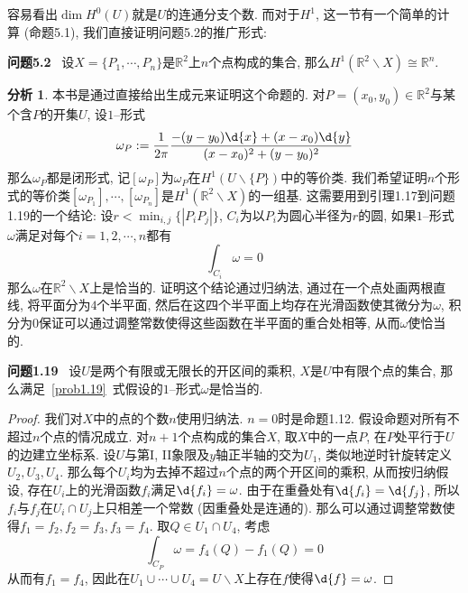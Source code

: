 \documentclass[11pt]{article}
\theoremstyle{definition}\newtheorem*{analyse}{分析}
\theoremstyle{remark}\newtheorem{rem*}{评注}
\newenvironment{env}[1]{\par\vspace{1em}\noindent\textbf{#1}\ }{\par\vspace{1em}}
\begin{document}
容易看出$\dim H^0(U)$就是$U$的连通分支个数.
而对于$H^1$, 这一节有一个简单的计算 (命题5.1), 我们直接证明问题5.2的推广形式:
\begin{env}{问题5.2}
    设$X=\{P_1,\cdots,P_n\}$是$\mathbb{R}^2$上$n$个点构成的集合, 那么$H^1(\mathbb{R}^2\backslash X)\cong\mathbb{R}^n$.
\end{env}
\begin{analyse}
    本书是通过直接给出生成元来证明这个命题的.
    对$P=(x_0,y_0)\in\mathbb{R}^2$与某个含$P$的开集$U$, 设$1$--形式
    \[\omega_P:=\frac{1}{2\pi}\frac{-(y-y_0)\d{x}+(x-x_0)\d{y}}{(x-x_0)^2+(y-y_0)^2}\]
    那么$\omega_P$都是闭形式, 记$[\omega_P]$为$\omega_P$在$H^1(U\backslash\{P\})$中的等价类.
    我们希望证明$n$个形式的等价类$[\omega_{P_1}],\cdots,[\omega_{P_n}]$是$H^1(\mathbb{R}^2\backslash X)$的一组基.
    这需要用到引理1.17到问题1.19的一个结论:
    设$r<\min_{i,j}\{|P_iP_j|\}$, $C_i$为以$P_i$为圆心半径为$r$的圆, 如果$1$--形式$\omega$满足对每个$i=1,2,\cdots,n$都有
    \begin{equation}
        \int_{C_i}\omega=0\label{prob1.19}
    \end{equation}
    那么$\omega$在$\mathbb{R}^2\backslash X$上是恰当的.
    证明这个结论通过归纳法, 通过在一个点处画两根直线, 将平面分为$4$个半平面, 然后在这四个半平面上均存在光滑函数使其微分为$\omega$,
    积分为$0$保证可以通过调整常数使得这些函数在半平面的重合处相等, 从而$\omega$使恰当的.
\end{analyse}
\begin{env}{问题1.19}
    设$U$是两个有限或无限长的开区间的乘积, $X$是$U$中有限个点的集合, 那么满足~\eqref{prob1.19}~式假设的$1$--形式$\omega$是恰当的.
\end{env}
\begin{proof}
    我们对$X$中的点的个数$n$使用归纳法.
    $n=0$时是命题1.12.
    假设命题对所有不超过$n$个点的情况成立.
    对$n+1$个点构成的集合$X$, 取$X$中的一点$P$, 在$P$处平行于$U$的边建立坐标系.
    设$U$与第I, II象限及$y$轴正半轴的交为$U_1$, 类似地逆时针旋转定义$U_2,U_3,U_4$.
    那么每个$U_i$均为去掉不超过$n$个点的两个开区间的乘积, 从而按归纳假设, 存在$U_i$上的光滑函数$f_i$满足$\d{f_i}=\omega$.
    由于在重叠处有$\d{f_i}=\d{f_j}$, 所以$f_i$与$f_j$在$U_i\cap U_j$上只相差一个常数 (因重叠处是连通的).
    那么可以通过调整常数使得$f_1=f_2,f_2=f_3,f_3=f_4$.
    取$Q\in U_1\cap U_4$, 考虑
    \[\int_{C_{P}}\omega=f_4(Q)-f_1(Q)=0\]
    从而有$f_1=f_4$, 因此在$U_1\cup\cdots\cup U_4=U\backslash X$上存在$f$使得$\d{f}=\omega$.
\end{proof}
\end{document}
